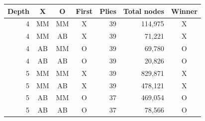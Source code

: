 \begin{tabular}{rcccrrc}
\toprule
Depth & X & O & First & Plies & Total nodes & Winner \\
\midrule
4 & MM & MM & X & 39 & 114,975 & X \\
4 & MM & AB & X & 39 & 71,221 & X \\
4 & AB & MM & O & 39 & 69,780 & O \\
4 & AB & AB & O & 39 & 20,826 & O \\
5 & MM & MM & X & 39 & 829,871 & X \\
5 & MM & AB & X & 39 & 478,121 & X \\
5 & AB & MM & O & 37 & 469,054 & O \\
5 & AB & AB & O & 37 & 78,566 & O \\
\bottomrule
\end{tabular}
